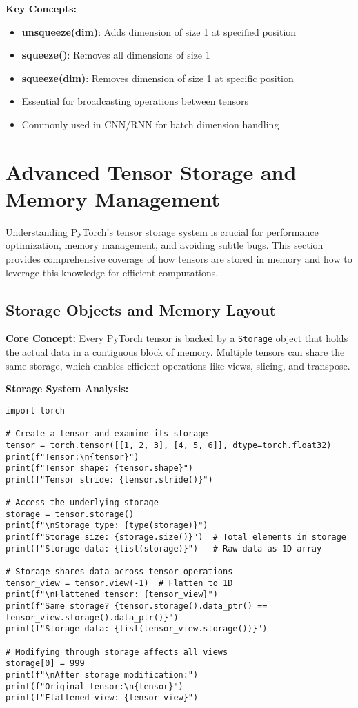 \documentclass[11pt,a4paper]{book}
\begin{document}
\textbf{Key Concepts:}
\begin{itemize}
    \item \textbf{unsqueeze(dim)}: Adds dimension of size 1 at specified position
    \item \textbf{squeeze()}: Removes all dimensions of size 1
    \item \textbf{squeeze(dim)}: Removes dimension of size 1 at specific position
    \item Essential for broadcasting operations between tensors
    \item Commonly used in CNN/RNN for batch dimension handling
\end{itemize}

\section{Advanced Tensor Storage and Memory Management}

\begin{keybox}
Understanding PyTorch's tensor storage system is crucial for performance optimization, memory management, and avoiding subtle bugs. This section provides comprehensive coverage of how tensors are stored in memory and how to leverage this knowledge for efficient computations.
\end{keybox}

\subsection{Storage Objects and Memory Layout}

\textbf{Core Concept:} Every PyTorch tensor is backed by a \texttt{Storage} object that holds the actual data in a contiguous block of memory. Multiple tensors can share the same storage, which enables efficient operations like views, slicing, and transpose.

\textbf{Storage System Analysis:}
\begin{verbatim}
import torch

# Create a tensor and examine its storage
tensor = torch.tensor([[1, 2, 3], [4, 5, 6]], dtype=torch.float32)
print(f"Tensor:\n{tensor}")
print(f"Tensor shape: {tensor.shape}")
print(f"Tensor stride: {tensor.stride()}")

# Access the underlying storage
storage = tensor.storage()
print(f"\nStorage type: {type(storage)}")
print(f"Storage size: {storage.size()}")  # Total elements in storage
print(f"Storage data: {list(storage)}")   # Raw data as 1D array

# Storage shares data across tensor operations
tensor_view = tensor.view(-1)  # Flatten to 1D
print(f"\nFlattened tensor: {tensor_view}")
print(f"Same storage? {tensor.storage().data_ptr() == tensor_view.storage().data_ptr()}")
print(f"Storage data: {list(tensor_view.storage())}")

# Modifying through storage affects all views
storage[0] = 999
print(f"\nAfter storage modification:")
print(f"Original tensor:\n{tensor}")
print(f"Flattened view: {tensor_view}")
\end{verbatim}
\end{document}
